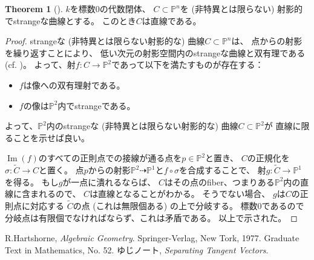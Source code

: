 \documentclass[uplatex]{jsarticle}
\theoremstyle{definition}
\newtheorem{thm}{Theorem}%
\DeclareMathOperator{\im}{\mathrm{Im}}
\renewcommand{\P}{\mathbb{P}}
\newcommand{\dto}{\dashrightarrow}
\begin{document}
\begin{thm}[{\cite[演習 IV.3.8.(b)]{Ha}}]
  \(k\)を標数\(0\)の代数閉体、
  \(C\subset \P^n\)を (非特異とは限らない) 射影的でstrangeな曲線とする。
  このとき\(C\)は直線である。
\end{thm}

\begin{proof}
  strangeな (非特異とは限らない射影的な) 曲線\(C\subset \P^n\)は、
  点からの射影を繰り返すことにより、
  低い次元の射影空間内のstrangeな曲線と双有理である
  (cf. \cite[演習 I.4.9.]{Ha})。
  よって、射\(f:C\to \P^2\)であって以下を満たすものが存在する：
  \begin{itemize}
    \item
    \(f\)は像への双有理射である。
    \item
    \(f\)の像は\(\P^2\)内でstrangeである。
  \end{itemize}
  よって、\(\P^2\)内のstrangeな (非特異とは限らない射影的な) 曲線\(C\subset \P^2\)が
  直線に限ることを示せば良い。

  \(\im(f)\)のすべての正則点での接線が通る点を\(p\in \P^2\)と置き、
  \(C\)の正規化を\(\sigma:\tilde{C}\to C\)と置く。
  点\(p\)からの射影\(\P^2\dto \P^1\)と\(f\circ \sigma\)を合成することで、
  射\(g:\tilde{C}\to \P^1\)を得る。
  もし\(g\)が一点に潰れるならば、
  \(C\)はその点のfiber、つまりある\(\P^2\)内の直線に含まれるので、
  \(C\)は直線となることがわかる。
  そうでない場合、
  \(g\)は\(C\)の正則点に対応する
  \(\tilde{C}\)の点 (これは無限個ある) の上で分岐する。
  標数\(0\)であるので分岐点は有限個でなければならず、これは矛盾である。
  以上で示された。
\end{proof}






\begin{thebibliography}{9}
  R.Hartshorne,
  \textit{Algebraic Geometry}.
  Springer-Verlag, New Tork, 1977. Graduate Text in Mathematics, No. 52.
  ゆじノート,
  \textit{Separating Tangent Vectors}.
\end{thebibliography}
\end{document}
